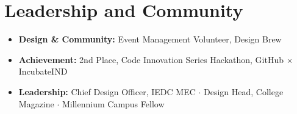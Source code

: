 \documentclass[letterpaper,11pt]{article}
\newcommand{\resumeItem}[1]{
  \item\small{
    {#1 \vspace{-2pt}}
  }
}
\newcommand{\resumeItemListStart}{\begin{itemize}}
\newcommand{\resumeItemListEnd}{\end{itemize}\vspace{-5pt}}
\begin{document}
\section{Leadership and Community}
 \resumeItemListStart
    \resumeItem{\textbf{Design \& Community:} Event Management Volunteer, Design Brew}
    \resumeItem{\textbf{Achievement:} 2nd Place, Code Innovation Series Hackathon, GitHub $\times$ IncubateIND}
    \resumeItem{\textbf{Leadership:} Chief Design Officer, IEDC MEC $\cdot$ Design Head, College Magazine $\cdot$ Millennium Campus Fellow}
 \resumeItemListEnd

\end{document}
